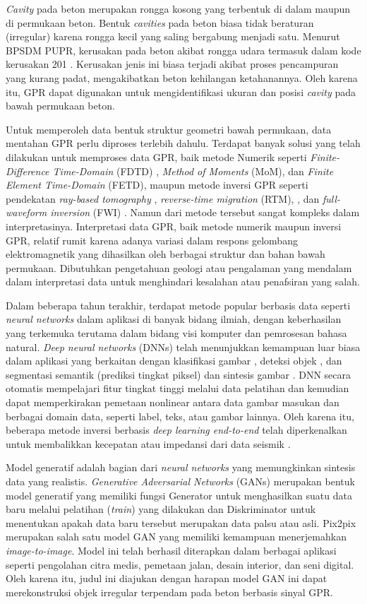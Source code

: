 \documentclass[conference]{IEEEtran}
\begin{document}
\emph{Cavity} pada beton merupakan rongga kosong yang terbentuk di dalam maupun di permukaan beton. 
Bentuk \emph{cavities} pada beton biasa tidak beraturan (irregular) karena rongga kecil yang saling bergabung menjadi satu. 
Menurut BPSDM PUPR, kerusakan pada beton akibat rongga udara termasuk dalam kode kerusakan 201 \cite{a2}. 
Kerusakan jenis ini biasa terjadi akibat proses pencampuran yang kurang padat, mengakibatkan beton kehilangan ketahanannya. 
Oleh karena itu, GPR dapat digunakan untuk mengidentifikasi ukuran dan posisi \emph{cavity} pada bawah permukaan beton.

Untuk memperoleh data bentuk struktur geometri bawah permukaan, data mentahan GPR perlu diproses terlebih dahulu. 
Terdapat banyak solusi yang telah dilakukan untuk memproses data GPR, baik metode Numerik seperti \emph{Finite-Difference Time-Domain} (FDTD) \cite{a3}, \emph{Method of Moments} (MoM)\cite{a4}, dan \emph{Finite Element Time-Domain} (FETD)\cite{a5}, 
maupun metode inversi GPR seperti pendekatan \emph{ray-based tomography} \cite{a6}, \emph{reverse-time migration} (RTM), \cite{a7}, dan \emph{full-waveform inversion} (FWI) \cite{a8}.
Namun dari metode tersebut sangat kompleks dalam interpretasinya. 
Interpretasi data GPR, baik metode numerik maupun inversi GPR, relatif rumit karena adanya variasi dalam respons gelombang elektromagnetik yang dihasilkan oleh berbagai struktur dan bahan bawah permukaan. 
Dibutuhkan pengetahuan geologi atau pengalaman yang mendalam dalam interpretasi data untuk menghindari kesalahan atau penafsiran yang salah.

Dalam beberapa tahun terakhir, terdapat metode popular berbasis data seperti \emph{neural networks} dalam aplikasi di banyak bidang ilmiah, dengan keberhasilan yang terkemuka terutama dalam bidang visi komputer dan pemrosesan bahasa natural. 
\emph{Deep neural networks} (DNNs) telah menunjukkan kemampuan luar biasa dalam aplikasi yang berkaitan dengan klasifikasi gambar \cite{a9}, deteksi objek \cite{a10}, dan segmentasi semantik (prediksi tingkat piksel) \cite{a11} dan sintesis gambar \cite{a12}. 
DNN secara otomatis mempelajari fitur tingkat tinggi melalui data pelatihan dan kemudian dapat memperkirakan pemetaan nonlinear antara data gambar masukan dan berbagai domain data, seperti label, teks, atau gambar lainnya. 
Oleh karena itu, beberapa metode inversi berbasis \emph{deep learning end-to-end} telah diperkenalkan untuk membalikkan kecepatan atau impedansi dari data seismik \cite{a13}.

Model generatif adalah bagian dari \emph{neural networks} yang memungkinkan sintesis data yang realistis. 
\emph{Generative Adversarial Networks} (GANs) merupakan bentuk model generatif yang memiliki fungsi Generator untuk menghasilkan suatu data baru melalui pelatihan (\emph{train}) yang dilakukan dan Diskriminator untuk menentukan apakah data baru tersebut merupakan data palsu atau asli. 
Pix2pix merupakan salah satu model GAN yang memiliki kemampuan menerjemahkan \emph{image-to-image}. 
Model ini telah berhasil diterapkan dalam berbagai aplikasi seperti pengolahan citra medis, pemetaan jalan, desain interior, dan seni digital. 
Oleh karena itu, judul ini diajukan dengan harapan model GAN ini dapat merekonstruksi objek irregular terpendam pada beton berbasis sinyal GPR.
\end{document}
